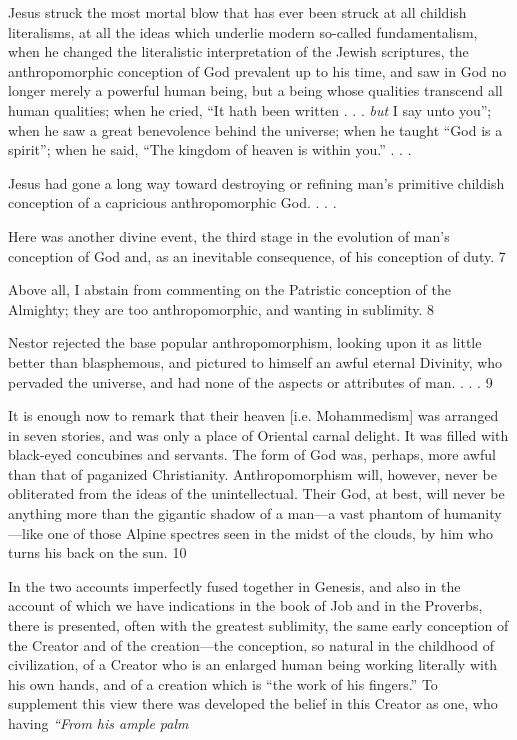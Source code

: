 Jesus struck the most mortal blow that has ever been struck at all childish literalisms, at all
the ideas which underlie modern so-called fundamentalism, when he changed the literalistic
interpretation of the Jewish scriptures, the anthropomorphic conception of God prevalent up
to his time, and saw in God no longer merely a powerful human being, but a being whose
qualities transcend all human qualities; when he cried, ``It hath been written . . . \textit{but} I say unto
you''; when he saw a great benevolence behind the universe; when he taught ``God is a spirit'';
when he said, ``The kingdom of heaven is within you.'' . . .

Jesus had gone a long way toward destroying or refining man's primitive childish conception
of a capricious anthropomorphic God. . . .

Here was another divine event, the third stage in the evolution of man's conception of God
and, as an inevitable consequence, of his conception of duty. 7

Above all, I abstain from commenting on the Patristic conception of the Almighty; they are
too anthropomorphic, and wanting in sublimity. 8

Nestor rejected the base popular anthropomorphism, looking upon it as little better than
blasphemous, and pictured to himself an awful eternal Divinity, who pervaded the universe,
and had none of the aspects or attributes of man. . . . 9

It is enough now to remark that their heaven [i.e. Mohammedism] was arranged in seven
stories, and was only a place of Oriental carnal delight. It was filled with black-eyed
concubines and servants. The form of God was, perhaps, more awful than that of paganized
Christianity. Anthropomorphism will, however, never be obliterated from the ideas of the
unintellectual. Their God, at best, will never be anything more than the gigantic shadow of a
man—a vast phantom of humanity—like one of those Alpine spectres seen in the midst of
the clouds, by him who turns his back on the sun. 10

In the two accounts imperfectly fused together in Genesis, and also in the account of which
we have indications in the book of Job and in the Proverbs, there is presented, often with the
greatest sublimity, the same early conception of the Creator and of the creation—the
conception, so natural in the childhood of civilization, of a Creator who is an enlarged human
being working literally with his own hands, and of a creation which is ``the work of his
fingers.'' To supplement this view there was developed the belief in this Creator as one, who
having \textit{``From his ample palm}

